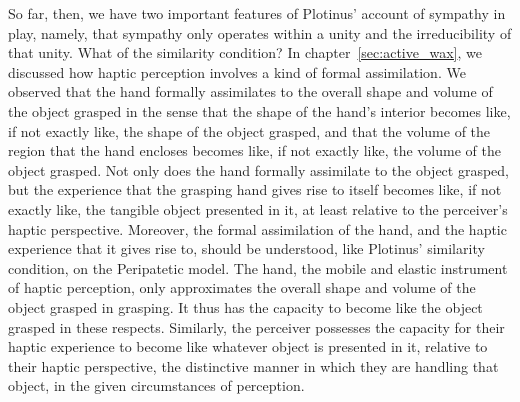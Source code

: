 So far, then, we have two important features of Plotinus' account of sympathy in play, namely, that sympathy only operates within a unity and the irreducibility of that unity. What of the similarity condition? In chapter~\ref{sec:active_wax}, we discussed how haptic perception involves a kind of formal assimilation. We observed that the hand formally assimilates to the overall shape and volume of the object grasped in the sense that the shape of the hand's interior becomes like, if not exactly like, the shape of the object grasped, and that the volume of the region that the hand encloses becomes like, if not exactly like, the volume of the object grasped. Not only does the hand formally assimilate to the object grasped, but the experience that the grasping hand gives rise to itself becomes like, if not exactly like, the tangible object presented in it, at least relative to the perceiver's haptic perspective. Moreover, the formal assimilation of the hand, and the haptic experience that it gives rise to, should be understood, like Plotinus' similarity condition, on the Peripatetic model. The hand, the mobile and elastic instrument of haptic perception, only approximates the overall shape and volume of the object grasped in grasping. It thus has the capacity to become like the object grasped in these respects. Similarly, the perceiver possesses the capacity for their haptic experience to become like whatever object is presented in it, relative to their haptic perspective, the distinctive manner in which they are handling that object, in the given circumstances of perception. 


